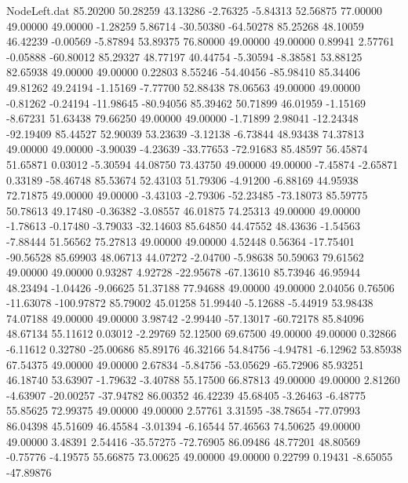 \begin{filecontents}{NodeLeft.dat}
  85.20200   50.28259   43.13286    -2.76325   -5.84313   52.56875   77.00000   49.00000   49.00000   -1.28259    5.86714  -30.50380  -64.50278
  85.25268   48.10059   46.42239    -0.00569   -5.87894   53.89375   76.80000   49.00000   49.00000    0.89941    2.57761   -0.05888  -60.80012
  85.29327   48.77197   40.44754    -5.30594   -8.38581   53.88125   82.65938   49.00000   49.00000    0.22803    8.55246  -54.40456  -85.98410
  85.34406   49.81262   49.24194    -1.15169   -7.77700   52.88438   78.06563   49.00000   49.00000   -0.81262   -0.24194  -11.98645  -80.94056
  85.39462   50.71899   46.01959    -1.15169   -8.67231   51.63438   79.66250   49.00000   49.00000   -1.71899    2.98041  -12.24348  -92.19409
  85.44527   52.90039   53.23639    -3.12138   -6.73844   48.93438   74.37813   49.00000   49.00000   -3.90039   -4.23639  -33.77653  -72.91683
  85.48597   56.45874   51.65871     0.03012   -5.30594   44.08750   73.43750   49.00000   49.00000   -7.45874   -2.65871    0.33189  -58.46748
  85.53674   52.43103   51.79306    -4.91200   -6.88169   44.95938   72.71875   49.00000   49.00000   -3.43103   -2.79306  -52.23485  -73.18073
  85.59775   50.78613   49.17480    -0.36382   -3.08557   46.01875   74.25313   49.00000   49.00000   -1.78613   -0.17480   -3.79033  -32.14603
  85.64850   44.47552   48.43636    -1.54563   -7.88444   51.56562   75.27813   49.00000   49.00000    4.52448    0.56364  -17.75401  -90.56528
  85.69903   48.06713   44.07272    -2.04700   -5.98638   50.59063   79.61562   49.00000   49.00000    0.93287    4.92728  -22.95678  -67.13610
  85.73946   46.95944   48.23494    -1.04426   -9.06625   51.37188   77.94688   49.00000   49.00000    2.04056    0.76506  -11.63078 -100.97872
  85.79002   45.01258   51.99440    -5.12688   -5.44919   53.98438   74.07188   49.00000   49.00000    3.98742   -2.99440  -57.13017  -60.72178
  85.84096   48.67134   55.11612     0.03012   -2.29769   52.12500   69.67500   49.00000   49.00000    0.32866   -6.11612    0.32780  -25.00686
  85.89176   46.32166   54.84756    -4.94781   -6.12962   53.85938   67.54375   49.00000   49.00000    2.67834   -5.84756  -53.05629  -65.72906
  85.93251   46.18740   53.63907    -1.79632   -3.40788   55.17500   66.87813   49.00000   49.00000    2.81260   -4.63907  -20.00257  -37.94782
  86.00352   46.42239   45.68405    -3.26463   -6.48775   55.85625   72.99375   49.00000   49.00000    2.57761    3.31595  -38.78654  -77.07993
  86.04398   45.51609   46.45584    -3.01394   -6.16544   57.46563   74.50625   49.00000   49.00000    3.48391    2.54416  -35.57275  -72.76905
  86.09486   48.77201   48.80569    -0.75776   -4.19575   55.66875   73.00625   49.00000   49.00000    0.22799    0.19431   -8.65055  -47.89876

\end{filecontents}
